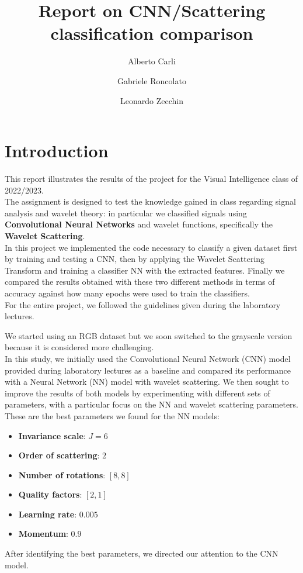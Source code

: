 \documentclass{report}
\title{Report on CNN/Scattering classification comparison}
\author{Alberto Carli \and Gabriele Roncolato \and Leonardo Zecchin }
\date{}
\begin{document}
\maketitle
\tableofcontents
\pagebreak

\chapter{Introduction}
This report illustrates the results of the project for the Visual Intelligence class of 2022/2023. \\
The assignment is designed to test the knowledge gained in class regarding signal analysis and wavelet theory: in particular we classified signals using \textbf{Convolutional Neural Networks} and wavelet functions, specifically the \textbf{Wavelet Scattering}. \\
In this project we implemented the code necessary to classify a given dataset first by training and testing a CNN, then by applying the Wavelet Scattering Transform and training a classifier NN with the extracted features.
Finally we compared the results obtained with these two different methods in terms of accuracy against how many epochs were used to train the classifiers. \\
For the entire project, we followed the guidelines given during the laboratory lectures.

We started using an RGB dataset but we soon switched to the grayscale version because it is considered more challenging.\\
In this study, we initially used the Convolutional Neural Network (CNN) model provided during laboratory
lectures as a baseline and compared its performance with a Neural Network (NN) model with wavelet scattering.
We then sought to improve the results of both models by experimenting with different sets of parameters, with a particular
focus on the NN and wavelet scattering parameters. \\
These are the best parameters we found for the NN models:
\begin{itemize}
  \item \textbf{Invariance scale}: $J=6$
  \item \textbf{Order of scattering}: $2$
  \item \textbf{Number of rotations}: $[8, 8]$
  \item \textbf{Quality factors}: $[2, 1]$
  \item \textbf{Learning rate}: $0.005$ 
  \item \textbf{Momentum}: $0.9$
\end{itemize}
After identifying the best parameters, we directed our attention to the CNN model.\\
\end{document}
